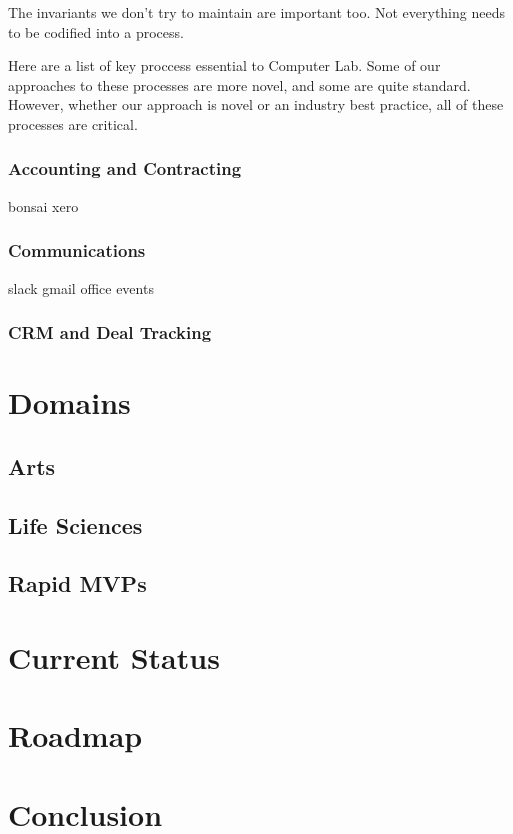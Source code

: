 \documentclass[12pt]{article}
\begin{document}
The invariants we don't try to maintain are important too. Not everything needs
to be codified into a process.

Here are a list of key proccess essential to Computer Lab. Some of our
approaches to these processes are more novel, and some are quite standard.
However, whether our approach is novel or an industry best practice, all of
these processes are critical.

\subsubsection{Accounting and Contracting}
bonsai
xero

\subsubsection{Communications}
slack gmail office events

\subsubsection{CRM and Deal Tracking}

\section{Domains}
\subsection{Arts}
\subsection{Life Sciences}
\subsection{Rapid MVPs}
\section{Current Status}
\section{Roadmap}
\section{Conclusion}
\end{document}
